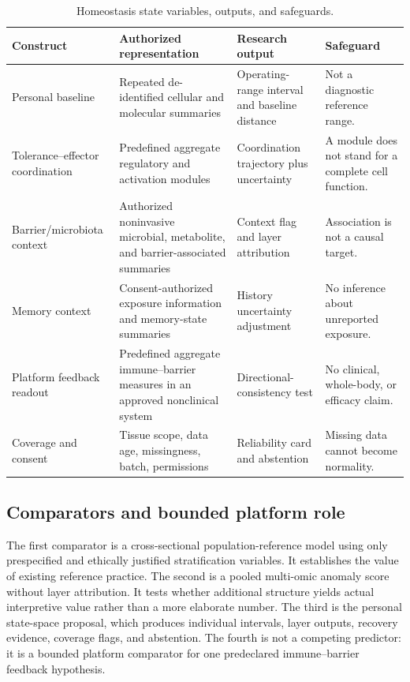 \documentclass[conference]{IEEEtran}
\begin{document}
\begin{table}[t]
\caption{Homeostasis state variables, outputs, and safeguards.}
\label{tab:variables}
\centering
\renewcommand{\arraystretch}{1.13}
\begin{tabular}{|p{}|p{}|p{}|p{}|}
\hline
\textbf{Construct} & \textbf{Authorized representation} & \textbf{Research output} & \textbf{Safeguard} \\
\hline
Personal baseline & Repeated de-identified cellular and molecular summaries & Operating-range interval and baseline distance & Not a diagnostic reference range. \\
\hline
Tolerance--effector coordination & Predefined aggregate regulatory and activation modules & Coordination trajectory plus uncertainty & A module does not stand for a complete cell function. \\
\hline
Barrier/microbiota context & Authorized noninvasive microbial, metabolite, and barrier-associated summaries & Context flag and layer attribution & Association is not a causal target. \\
\hline
Memory context & Consent-authorized exposure information and memory-state summaries & History uncertainty adjustment & No inference about unreported exposure. \\
\hline
Platform feedback readout & Predefined aggregate immune--barrier measures in an approved nonclinical system & Directional-consistency test & No clinical, whole-body, or efficacy claim. \\
\hline
Coverage and consent & Tissue scope, data age, missingness, batch, permissions & Reliability card and abstention & Missing data cannot become normality. \\
\hline
\end{tabular}
\end{table}

\subsection{Comparators and bounded platform role}

The first comparator is a cross-sectional population-reference model using only prespecified and ethically justified stratification variables. It establishes the value of existing reference practice. The second is a pooled multi-omic anomaly score without layer attribution. It tests whether additional structure yields actual interpretive value rather than a more elaborate number. The third is the personal state-space proposal, which produces individual intervals, layer outputs, recovery evidence, coverage flags, and abstention. The fourth is not a competing predictor: it is a bounded platform comparator for one predeclared immune--barrier feedback hypothesis.
\end{document}
